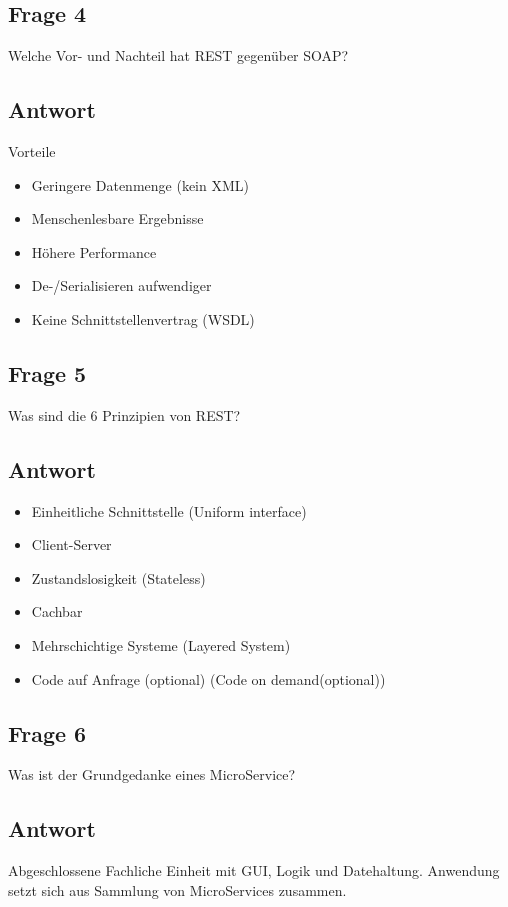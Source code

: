 \subsection*{Frage 4}
Welche Vor- und Nachteil hat REST gegenüber SOAP?
\subsection*{Antwort}
Vorteile
\begin{itemize}
	\item Geringere Datenmenge (kein XML)
	\item Menschenlesbare Ergebnisse
	\item Höhere Performance
\end{itemize}

\begin{itemize}
	\item De-/Serialisieren aufwendiger
	\item Keine Schnittstellenvertrag (WSDL)
\end{itemize}
\subsection*{Frage 5}
Was sind die 6 Prinzipien von REST?
\subsection*{Antwort}
\begin{itemize}
	\item Einheitliche Schnittstelle (Uniform interface)
	\item Client-Server
	\item Zustandslosigkeit (Stateless)
	\item Cachbar
	\item Mehrschichtige Systeme (Layered System)
	\item Code auf Anfrage (optional) (Code on demand(optional))
\end{itemize}
\subsection*{Frage 6}
Was ist der Grundgedanke eines MicroService?
\subsection*{Antwort}
Abgeschlossene Fachliche Einheit mit GUI, Logik und Datehaltung. Anwendung setzt sich aus Sammlung von MicroServices zusammen.

